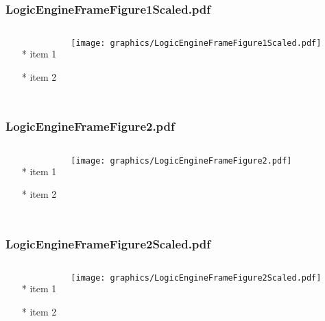 \documentclass{beamer}
\begin{document}
\begin{frame} \frametitle{LogicEngineFrameFigure1Scaled.pdf}
    \begin{columns}[c]
        \begin{itemize}
            \item[*] item 1
            \item[*] item 2
        \end{itemize}
        \begin{minipage}{\linewidth}
            \begin{center}
            \texttt{[image: graphics/LogicEngineFrameFigure1Scaled.pdf]}
            \label{gfx:LogicEngineFrameFigure1Scaled.pdf}
            \end{center}
        \end{minipage}
    \end{columns}
\end{frame}
\begin{frame} \frametitle{LogicEngineFrameFigure2.pdf}
    \begin{columns}[c]
        \begin{itemize}
            \item[*] item 1
            \item[*] item 2
        \end{itemize}
        \begin{minipage}{\linewidth}
            \begin{center}
            \texttt{[image: graphics/LogicEngineFrameFigure2.pdf]}
            \label{gfx:LogicEngineFrameFigure2.pdf}
            \end{center}
        \end{minipage}
    \end{columns}
\end{frame}
\begin{frame} \frametitle{LogicEngineFrameFigure2Scaled.pdf}
    \begin{columns}[c]
        \begin{itemize}
            \item[*] item 1
            \item[*] item 2
        \end{itemize}
        \begin{minipage}{\linewidth}
            \begin{center}
            \texttt{[image: graphics/LogicEngineFrameFigure2Scaled.pdf]}
            \label{gfx:LogicEngineFrameFigure2Scaled.pdf}
            \end{center}
        \end{minipage}
    \end{columns}
\end{frame}
\end{document}
